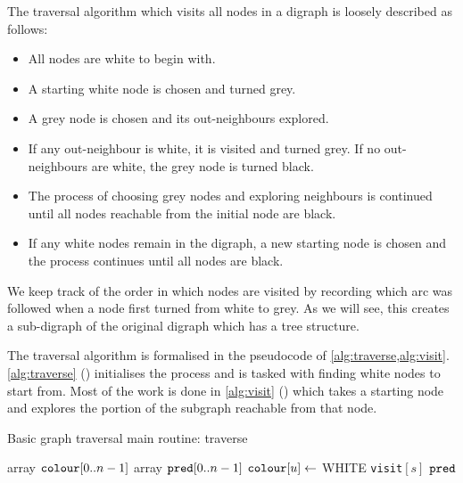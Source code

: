 The traversal algorithm which visits all nodes in a digraph is loosely described as follows: 
\begin{itemize}
\item All nodes are white to begin with.
\item A starting white node is chosen and turned grey.
\item A grey node is chosen and its out-neighbours explored. 
\item If any out-neighbour is white, it is visited and turned grey. If no out-neighbours are white, the grey node is turned black. 
\item The process of choosing grey nodes and exploring neighbours is continued until all nodes reachable from the initial node are black.
\item If any white nodes remain in the digraph, a new  starting node is chosen and the process continues until all nodes are black.
\end{itemize}

We keep track of the order in which nodes are visited by recording which arc was followed when a node first turned from white to grey. 
As we will see, this creates a sub-digraph of the original digraph which has a tree structure.

The traversal algorithm is formalised in the pseudocode  of \cref{alg:traverse,alg:visit}.  
\cref{alg:traverse} () initialises the process and is tasked with finding white nodes to start from. 
Most of the work is done in \cref{alg:visit} () which takes a starting node and explores the portion of the subgraph reachable from that node.

\begin{algorithm}[H]
  \caption{Basic graph traversal main routine: traverse
    \label{alg:traverse}}
\begin{algorithmic}[1]
	\State  array $\colour[0..n-1]$ 
	\State array $\pred[0..n-1]$ 
	 
		\State $\colour[u] \gets $ WHITE 
	\EndFor
	  
			\State \texttt{visit}$[s]$ 
		\EndIf
	\EndFor
	\Return $\pred$ 
\EndFunction
\end{algorithmic}
\end{algorithm}

